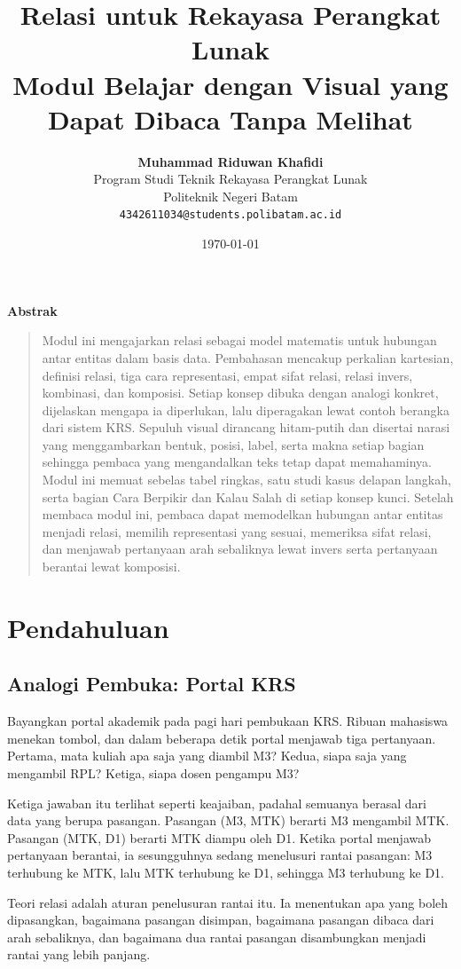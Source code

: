 \documentclass[11pt,a4paper]{article}
\title{\vspace{-1.5cm}\textbf{\sffamily\LARGE Relasi untuk Rekayasa Perangkat Lunak\\ Modul Belajar dengan Visual yang Dapat Dibaca Tanpa Melihat}}
\author{
	\textbf{Muhammad Riduwan Khafidi} \\
	\small Program Studi Teknik Rekayasa Perangkat Lunak \\
	\small Politeknik Negeri Batam \\
	\small \texttt{4342611034@students.polibatam.ac.id}
}
\date{\small\today}
\renewenvironment{abstract}
{\small
	\begin{center}\textbf{\sffamily Abstrak}\end{center}
	\begin{quote}}
	{\end{quote}}
\begin{document}
\maketitle
\thispagestyle{empty}

\begin{abstract}
	Modul ini mengajarkan relasi sebagai model matematis untuk hubungan antar entitas dalam basis data. Pembahasan mencakup perkalian kartesian, definisi relasi, tiga cara representasi, empat sifat relasi, relasi invers, kombinasi, dan komposisi. Setiap konsep dibuka dengan analogi konkret, dijelaskan mengapa ia diperlukan, lalu diperagakan lewat contoh berangka dari sistem KRS. Sepuluh visual dirancang hitam-putih dan disertai narasi yang menggambarkan bentuk, posisi, label, serta makna setiap bagian sehingga pembaca yang mengandalkan teks tetap dapat memahaminya. Modul ini memuat sebelas tabel ringkas, satu studi kasus delapan langkah, serta bagian Cara Berpikir dan Kalau Salah di setiap konsep kunci. Setelah membaca modul ini, pembaca dapat memodelkan hubungan antar entitas menjadi relasi, memilih representasi yang sesuai, memeriksa sifat relasi, dan menjawab pertanyaan arah sebaliknya lewat invers serta pertanyaan berantai lewat komposisi.
\end{abstract}

\section{Pendahuluan}

\subsection{Analogi Pembuka: Portal KRS}

Bayangkan portal akademik pada pagi hari pembukaan KRS. Ribuan mahasiswa menekan tombol, dan dalam beberapa detik portal menjawab tiga pertanyaan. Pertama, mata kuliah apa saja yang diambil M3? Kedua, siapa saja yang mengambil RPL? Ketiga, siapa dosen pengampu M3?

Ketiga jawaban itu terlihat seperti keajaiban, padahal semuanya berasal dari data yang berupa pasangan. Pasangan (M3, MTK) berarti M3 mengambil MTK. Pasangan (MTK, D1) berarti MTK diampu oleh D1. Ketika portal menjawab pertanyaan berantai, ia sesungguhnya sedang menelusuri rantai pasangan: M3 terhubung ke MTK, lalu MTK terhubung ke D1, sehingga M3 terhubung ke D1.

Teori relasi adalah aturan penelusuran rantai itu. Ia menentukan apa yang boleh dipasangkan, bagaimana pasangan disimpan, bagaimana pasangan dibaca dari arah sebaliknya, dan bagaimana dua rantai pasangan disambungkan menjadi rantai yang lebih panjang.
\end{document}
